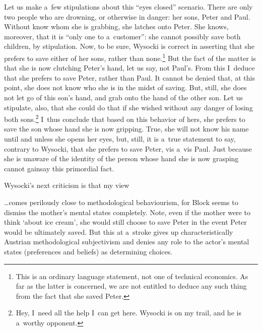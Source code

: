 Let us make a~few stipulations about this ``eyes closed'' scenario. There are only two people who are drowning, or otherwise in danger: her sons, Peter and Paul. Without know whom she is grabbing, she latches onto Peter. She knows, moreover, that it is ``only one to a~customer'': she cannot possibly save both children, by stipulation. Now, to be sure, Wysocki is correct in asserting that she prefers to save either of her sons, rather than none.\footnote{This is an ordinary language statement, not one of technical economics. As far as the latter is concerned, we are not entitled to deduce any such thing from the fact that she saved Peter.} But the fact of the matter is that she is now clutching Peter's hand, let us say, not Paul's. From this I~deduce that she prefers to save Peter, rather than Paul. It cannot be denied that, at this point, she does not know who she is in the midst of saving. But, still, she does not let go of this son's hand, and grab onto the hand of the other son. Let us stipulate, also, that she could do that if she wished without any danger of losing both sons.\footnote{Hey, I~need all the help I~can get here. Wysocki is on my trail, and he is a~worthy opponent.} I~thus conclude that based on this behavior of hers, she prefers to save the son whose hand she is now gripping. True, she will not know his name until and unless she opens her eyes, but, still, it is a~true statement to say, contrary to Wysocki, that she prefers to save Peter, vis a~vis Paul. Just because she is unaware of the identity of the person whose hand she is now grasping cannot gainsay this primordial fact.



Wysocki's next criticism is that my view



…comes perilously close to methodological behaviourism, for Block seems to dismiss the mother's mental states completely. Note, even if the mother were to think ‘about ice cream', she would still choose to save Peter in the event Peter would be ultimately saved. But this at a~stroke gives up characteristically Austrian methodological subjectivism and denies any role to the actor's mental states (preferences and beliefs) as determining choices.



